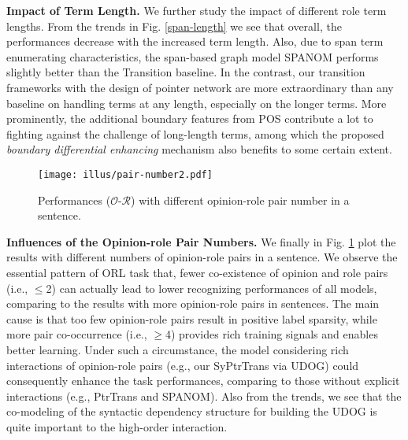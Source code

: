 \documentclass[letterpaper]{article} \usepackage{aaai22}  \usepackage{times}  \usepackage{helvet}  \usepackage{courier}  \usepackage[hyphens]{url}  \usepackage{graphicx} \urlstyle{rm} \def\UrlFont{\rm}  \usepackage{natbib}  \usepackage{caption} \DeclareCaptionStyle{ruled}{labelfont=normalfont,labelsep=colon,strut=off} \frenchspacing  \setlength{\pdfpagewidth}{8.5in}  \setlength{\pdfpageheight}{11in}  \usepackage{algorithm}
\begin{document}
\noindent\textbf{Impact of Term Length.}
We further study the impact of different role term lengths.
From the trends in Fig. \ref{span-length} we see that overall, the performances decrease with the increased term length.
Also, due to span term enumerating characteristics, the span-based graph model S{\small PAN}OM performs slightly better than the Transition baseline.
In the contrast, our transition frameworks with the design of pointer network are more extraordinary than any baseline on handling terms at any length, especially on the longer terms.
More prominently, the additional boundary features from POS contribute a lot to fighting against the challenge of long-length terms, among which the proposed \emph{boundary differential enhancing} mechanism also benefits to some certain extent.





















\begin{figure}[!t]
\centering
\texttt{[image: illus/pair-number2.pdf]}
\caption{
Performances ($\mathcal{O}$-$\mathcal{R}$) with different opinion-role pair number in a sentence.
}
\label{pair-number}
\end{figure}













\vspace{3pt}
\noindent\textbf{Influences of the Opinion-role Pair Numbers.}
We finally in Fig. \ref{pair-number} plot the results with different numbers of opinion-role pairs in a sentence.
We observe the essential pattern of ORL task that, fewer co-existence of opinion and role pairs (i.e., $\le$2) can actually lead to lower recognizing performances of all models, comparing to the results with more opinion-role pairs in sentences.
The main cause is that too few opinion-role pairs result in positive label sparsity, while more pair co-occurrence (i.e., $\ge$4) provides rich training signals and enables better learning.
Under such a circumstance, the model considering rich interactions of opinion-role pairs (e.g., our SyPtrTrans via UDOG) could consequently enhance the task performances, comparing to those without explicit interactions (e.g., PtrTrans and S{\small PAN}OM).
Also from the trends, we see that the co-modeling of the syntactic dependency structure for building the UDOG is quite important to the high-order interaction.
\end{document}

